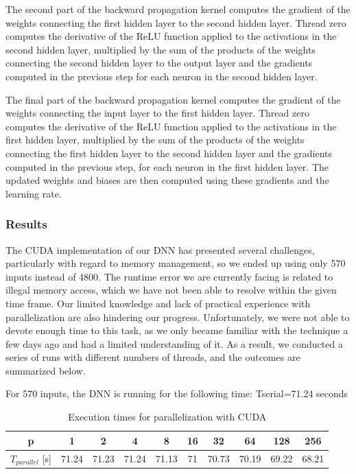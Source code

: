 \documentclass[11pt]{article}
\begin{document}
\bigskip

The second part of the backward propagation kernel computes the gradient of the weights connecting the first hidden layer to the second hidden layer. Thread zero computes the derivative of the ReLU function applied to the activations in the second hidden layer, multiplied by the sum of the products of the weights connecting the second hidden layer to the output layer and the gradients computed in the previous step for each neuron in the second hidden layer. 

\bigskip

The final part of the backward propagation kernel computes the gradient of the weights connecting the input layer to the first hidden layer. Thread zero computes the derivative of the ReLU function applied to the activations in the first hidden layer, multiplied by the sum of the products of the weights connecting the first hidden layer to the second hidden layer and the gradients computed in the previous step, for each neuron in the first hidden layer. The updated weights and biases are then computed using these gradients and the learning rate.

\subsubsection{Results}

The CUDA implementation of our DNN has presented several challenges, particularly with regard to memory management, so we ended up using only 570 inputs instead of 4800. The runtime error we are currently facing is related to illegal memory access, which we have not been able to resolve within the given time frame. Our limited knowledge and lack of practical experience with parallelization are also hindering our progress. Unfortunately, we were not able to devote enough time to this task, as we only became familiar with the technique a few days ago and had a limited understanding of it. As a result, we conducted a series of runs with different numbers of threads, and the outcomes are summarized below.

\bigskip

For 570 inputs, the DNN is running for the following time:
Tserial=71.24 seconds
\begin{table}[H]
\centering
\begin{tabular}{|c|c|c|c|c|c|c|c|c|c|}
\hline
 p & 1 & 2 & 4 & 8 & 16 & 32 & 64 & 128 & 256 \\ \hline
 $T_{parallel}$ [s] & 71.24 & 71.23 & 71.24 & 71.13 & 71 & 70.73 & 70.19 & 69.22 & 68.21 \\ \hline
\end{tabular}
\caption{Execution times for parallelization with CUDA} \label{timeCUDA}
\end{table}
\end{document}

